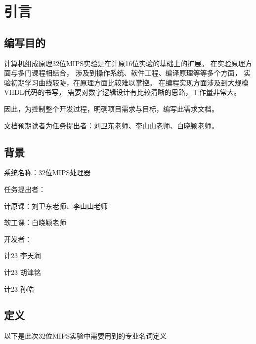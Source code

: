 \section{引言}
    \subsection{编写目的}
        计算机组成原理32位MIPS实验是在计原16位实验的基础上的扩展。%
        在实验原理方面与多门课程相结合，%
        涉及到操作系统、软件工程、编译原理等等多个方面，%
        实验初期学习曲线较陡，在原理方面比较难以掌控。%
        在编程实现方面涉及到大规模VHDL代码的书写，%
        需要对数字逻辑设计有比较清晰的思路，工作量非常大。

        因此，为控制整个开发过程，明确项目需求与目标，编写此需求文档。 

        文档预期读者为任务提出者：刘卫东老师、李山山老师、白晓颖老师。
    \subsection{背景}
        系统名称：32位MIPS处理器

        任务提出者：
        \begin{minipage}[t]{0.5\linewidth}
        计原课：刘卫东老师、李山山老师

        软工课：白晓颖老师
        \end{minipage}
        

        开发者：
        \begin{minipage}[t]{0.5\linewidth}
        计23 李天润

        计23 胡津铭

        计23 孙皓
        \end{minipage}

    \subsection{定义}
        以下是此次32位MIPS实验中需要用到的专业名词定义

